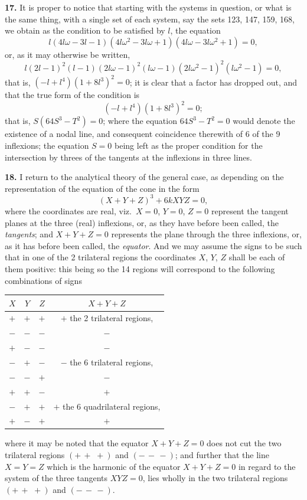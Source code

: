 \documentclass[11pt,a4paper]{article}
\theoremstyle{plain}
\begin{document}
\noindent\textbf{17.} It is proper to notice that starting with the systems in question, or what is the same thing, with a single set of each system, say the sets 123, 147, 159, 168, we obtain as the condition to be satisfied by $l$, the equation
\[
l(4l\omega-3l-1)(4l\omega^2-3l\omega+1)(4l\omega-3l\omega^2+1) = 0,
\]
or, as it may otherwise be written,
\[
l(2l-1)^2(l-1)(2l\omega-1)^2(l\omega-1)(2l\omega^2-1)^2(l\omega^2-1) = 0,
\]
that is, $(-l+l^4)(1+8l^3)^2 = 0$; it is clear that a factor has dropped out, and that the true form of the condition is
\[
(-l+l^4)(1+8l^3)^2 = 0;
\]
that is, $S(64S^3-T^2)=0$; where the equation $64S^3-T^2=0$ would denote the existence of a nodal line, and consequent coincidence therewith of 6 of the 9 inflexions; the equation $S=0$ being left as the proper condition for the intersection by threes of the tangents at the inflexions in three lines.

\noindent\textbf{18.} I return to the analytical theory of the general case, as depending on the representation of the equation of the cone in the form
\[
(X+Y+Z)^3 + 6kXYZ = 0,
\]
where the coordinates are real, viz.\ $X=0$, $Y=0$, $Z=0$ represent the tangent planes at the three (real) inflexions, or, as they have before been called, the \textit{tangents}; and $X+Y+Z=0$ represents the plane through the three inflexions, or, as it has before been called, the \textit{equator}. And we may assume the signs to be such that in one of the 2 trilateral regions the coordinates $X$, $Y$, $Z$ shall be each of them positive: this being so the 14 regions will correspond to the following combinations of signs
\begin{center}
\begin{tabular}{cccc}
$X$ & $Y$ & $Z$ & $X+Y+Z$ \\
\midrule
$+$ & $+$ & $+$ & $+$ \quad the 2 trilateral regions, \\
$-$ & $-$ & $-$ & $-$ \\
$+$ & $-$ & $-$ & $-$ \\
$-$ & $+$ & $-$ & $-$ \quad the 6 trilateral regions, \\
$-$ & $-$ & $+$ & $-$ \\
$+$ & $+$ & $-$ & $+$ \\
$-$ & $+$ & $+$ & $+$ \quad the 6 quadrilateral regions, \\
$+$ & $-$ & $+$ & $+$ \\
\end{tabular}
\end{center}
where it may be noted that the equator $X+Y+Z=0$ does not cut the two trilateral regions $(+\,+\,\,+)$ and $(-\,-\,-)$; and further that the line $X=Y=Z$ which is the harmonic of the equator $X+Y+Z=0$ in regard to the system of the three tangents $XYZ=0$, lies wholly in the two trilateral regions $(+\,+\,\,+)$ and $(-\,-\,-)$.
\end{document}
